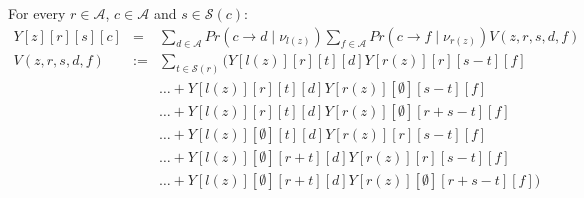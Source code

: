 \documentclass[11pt]{article}
\begin{document}
For every $r\in \mathcal{A}$, $c\in \mathcal{A}$ and $s\in\mathcal{S}(c)$:
\begin{eqnarray*}
Y[z][r][s][c] & = & \sum_{d\in \mathcal{A}}Pr(c\rightarrow d\mid \nu_{l(z)})\sum_{f\in \mathcal{A}}Pr(c\rightarrow f\mid \nu_{r(z)}) V(z, r, s, d, f) \\
V(z, r, s, d, f) & := &\sum_{t\in \mathcal{S}(r)}\Bigg(Y[l(z)][r][t][d] Y[r(z)][r][s - t][f]
\\ 
& & \ldots + Y[l(z)][r][t][d] Y[r(z)][\emptyset][s - t][f] \\
& & \ldots + Y[l(z)][r][t][d] Y[r(z)][\emptyset][r + s - t][f]\\
& & \ldots + Y[l(z)][\emptyset][t][d] Y[r(z)][r][s - t][f] \\
& & \ldots + Y[l(z)][\emptyset][r + t][d] Y[r(z)][r][s - t][f]\\
& & \ldots + Y[l(z)][\emptyset][r + t][d] Y[r(z)][\emptyset][r + s - t][f] \Bigg)
\end{eqnarray*}


\end{document}
